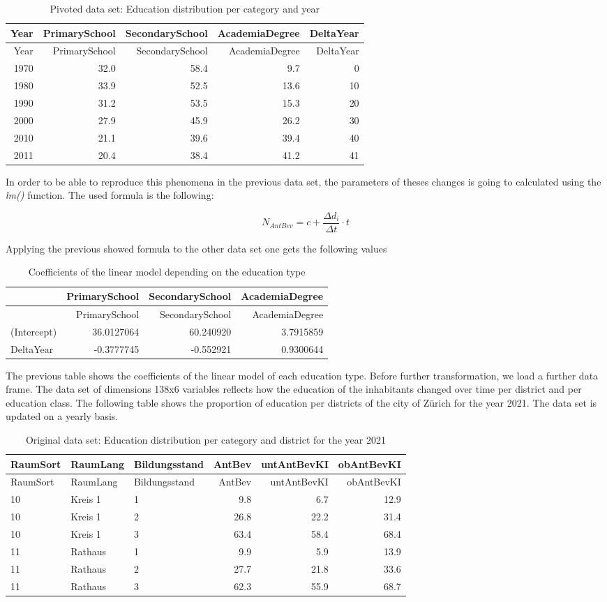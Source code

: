 \documentclass[
]{article}
\begin{document}
\begin{longtable}[]{@{}rrrrr@{}}
\caption{Pivoted data set: Education distribution per category and
year}\tabularnewline
\toprule
Year & PrimarySchool & SecondarySchool & AcademiaDegree &
DeltaYear\tabularnewline
\midrule
\endfirsthead
\toprule
Year & PrimarySchool & SecondarySchool & AcademiaDegree &
DeltaYear\tabularnewline
\midrule
\endhead
1970 & 32.0 & 58.4 & 9.7 & 0\tabularnewline
1980 & 33.9 & 52.5 & 13.6 & 10\tabularnewline
1990 & 31.2 & 53.5 & 15.3 & 20\tabularnewline
2000 & 27.9 & 45.9 & 26.2 & 30\tabularnewline
2010 & 21.1 & 39.6 & 39.4 & 40\tabularnewline
2011 & 20.4 & 38.4 & 41.2 & 41\tabularnewline
\bottomrule
\end{longtable}

In order to be able to reproduce this phenomena in the previous data
set, the parameters of theses changes is going to calculated using the
\emph{lm()} function. The used formula is the following:

\[N_{AntBev} = c + \frac{\Delta d_{i}}{\Delta t} \cdot t \]

Applying the previous showed formula to the other data set one gets the
following values

\begin{longtable}[]{@{}lrrr@{}}
\caption{Coefficients of the linear model depending on the education
type}\tabularnewline
\toprule
& PrimarySchool & SecondarySchool & AcademiaDegree\tabularnewline
\midrule
\endfirsthead
\toprule
& PrimarySchool & SecondarySchool & AcademiaDegree\tabularnewline
\midrule
\endhead
(Intercept) & 36.0127064 & 60.240920 & 3.7915859\tabularnewline
DeltaYear & -0.3777745 & -0.552921 & 0.9300644\tabularnewline
\bottomrule
\end{longtable}

The previous table shows the coefficients of the linear model of each
education type. Before further transformation, we load a further data
frame. The data set of dimensions 138x6 variables reflects how the
education of the inhabitants changed over time per district and per
education class. The following table shows the proportion of education
per districts of the city of Zürich for the year 2021. The data set is
updated on a yearly basis.

\begin{longtable}[]{@{}lllrrr@{}}
\caption{Original data set: Education distribution per category and
district for the year 2021}\tabularnewline
\toprule
RaumSort & RaumLang & Bildungsstand & AntBev & untAntBevKI &
obAntBevKI\tabularnewline
\midrule
\endfirsthead
\toprule
RaumSort & RaumLang & Bildungsstand & AntBev & untAntBevKI &
obAntBevKI\tabularnewline
\midrule
\endhead
10 & Kreis 1 & 1 & 9.8 & 6.7 & 12.9\tabularnewline
10 & Kreis 1 & 2 & 26.8 & 22.2 & 31.4\tabularnewline
10 & Kreis 1 & 3 & 63.4 & 58.4 & 68.4\tabularnewline
11 & Rathaus & 1 & 9.9 & 5.9 & 13.9\tabularnewline
11 & Rathaus & 2 & 27.7 & 21.8 & 33.6\tabularnewline
11 & Rathaus & 3 & 62.3 & 55.9 & 68.7\tabularnewline
\bottomrule
\end{longtable}
\end{document}
